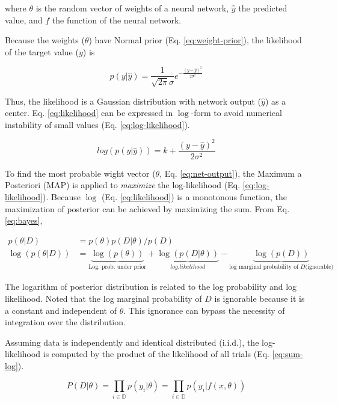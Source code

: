 \documentclass{article}
\begin{document}
where $\theta$ is the random vector of weights of a neural network, $\hat{y}$ the predicted value, and $f$ the function of the neural network.

Because the weights ($\theta$) have Normal prior (Eq. \ref{eq:weight-prior}),  the likelihood of the target value ($y$) is 

\begin{equation}
    p(y|\hat{y}) = \frac{1}{\sqrt{2\pi}\sigma}e^{-\frac{(y-\hat{y})^2}{2\sigma^2}}
    \label{eq:likelihood}
\end{equation}

Thus, the likelihood is a Gaussian distribution with network output ($\hat{y}$) as a center. Eq. \ref{eq:likelihood} can be expressed in $\log$-form to avoid numerical instability of small values (Eq. \ref{eq:log-likelihood}).

\begin{equation}
    log (p(y|\hat{y})) = k + \frac{(y-\hat{y})^2}{2\sigma^2}
    \label{eq:log-likelihood}
\end{equation}


To find the most probable wight vector ($\theta$, Eq. \ref{eq:net-output}), the Maximum a Posteriori (MAP) is applied to \textit{maximize} the log-likelihood (Eq. \ref{eq:log-likelihood}). Because $\log$ (Eq. \ref{eq:likelihood}) is a monotonous function, the maximization of posterior can be achieved by maximizing the sum. From Eq. \ref{eq:bayes}, 

\begin{align}
    p(\theta|D) &= p(\theta) p(D|\theta) / p(D)\\
    \log(p(\theta|D)) &= \underbrace{\log(p(\theta))}_{\text{Log. prob. under prior}} + \underbrace{\log(p(D|\theta))}_{log. likelihood} - \underbrace{\log(p(D))}_{\text{log marginal probability of } D \text{(ignorable)}}\label{eq:log-sums}
\end{align}

The logarithm of posterior distribution is related to the log probability and log likelihood. Noted that the log marginal probability of $D$ is ignorable because it is a constant and independent of $\theta$. This ignorance can bypass the necessity of integration over the distribution.


Assuming data is independently and identical distributed (i.i.d.), the log-likelihood is computed by the product of the likelihood of all trials (Eq. \ref{eq:sum-log}).

\begin{equation}
    P(D|\theta) = \prod_{i\in \mathbb{D}} p(y_i | \theta) = \prod_{i \in \mathbb{D}} p(y_i | f(x, \theta))
\label{eq:sum-log}
\end{equation}
\end{document}
